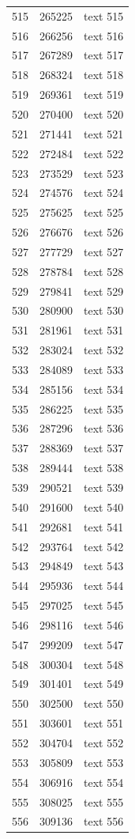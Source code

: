 \documentclass[10pt]{article}
\begin{document}
\begin{longtable}{rrl}
515&265225&text 515\\
516&266256&text 516\\
517&267289&text 517\\
518&268324&text 518\\
519&269361&text 519\\
520&270400&text 520\\
521&271441&text 521\\
522&272484&text 522\\
523&273529&text 523\\
524&274576&text 524\\
525&275625&text 525\\
526&276676&text 526\\
527&277729&text 527\\
528&278784&text 528\\
529&279841&text 529\\
530&280900&text 530\\
531&281961&text 531\\
532&283024&text 532\\
533&284089&text 533\\
534&285156&text 534\\
535&286225&text 535\\
536&287296&text 536\\
537&288369&text 537\\
538&289444&text 538\\
539&290521&text 539\\
540&291600&text 540\\
541&292681&text 541\\
542&293764&text 542\\
543&294849&text 543\\
544&295936&text 544\\
545&297025&text 545\\
546&298116&text 546\\
547&299209&text 547\\
548&300304&text 548\\
549&301401&text 549\\
550&302500&text 550\\
551&303601&text 551\\
552&304704&text 552\\
553&305809&text 553\\
554&306916&text 554\\
555&308025&text 555\\
556&309136&text 556\\

\end{longtable}
\end{document}
